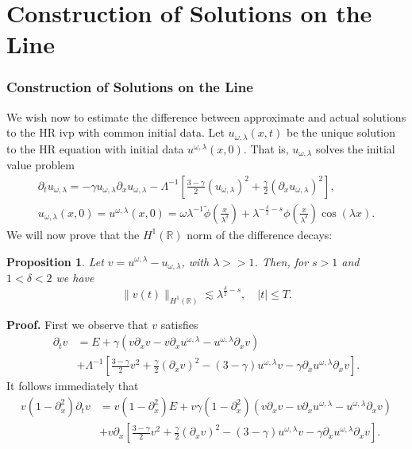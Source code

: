 \documentclass{beamer}
\newcommand{\rr}{\mathbb{R}}
\newcommand{\p}{\partial}
\newtheorem{proposition}{Proposition}
\begin{document}
\section{Construction of Solutions on the Line}
\begin{frame}
	\frametitle{Construction of Solutions on the Line}
We wish now to estimate the difference between approximate and actual 
solutions to
the HR ivp with common initial data. Let
$u_{\omega,\lambda}(x,t)$ be the unique solution to the HR equation
with initial data $u^{\omega,\lambda}(x,0)$. That is,
$u_{\omega,\lambda}$ solves the initial value problem
\begin{gather*}
 \p_t u_{\omega,\lambda} = - \gamma u_{\omega,\lambda} \p_x 
u_{\omega,\lambda} - \Lambda^{-1} \left[
\frac{3- \gamma}{2}\left( u_{\omega,\lambda} \right)^2 + 
\frac{\gamma}{2}\left(
\p_x u_{\omega,\lambda} \right)^2
\right], 
\\
 u_{\omega,\lambda}(x, 0) = u^{\omega,\lambda}(x,0) = \omega \lambda^{-1}
\tilde{\phi} \left( \frac{x}{\lambda^\delta} \right)
+ \lambda^{-\frac{\delta}{2} -s}
\phi\left( \frac{x}{\lambda^\delta} \right) \cos(\lambda x).
\end{gather*}
%
%
%
We will now prove that the $H^1(\rr)$ norm of the difference decays: 
%
\end{frame}
%
%
%
%
%
%
%
%
%
%
%
%
\begin{frame}
%
%
\begin{proposition}
\label{applelem:bound_for_difference-of-approx-and-actual-soln}
%
Let $v = u^{\omega,\lambda} - u_{\omega,\lambda}$, with $\lambda >>1$.
Then, for $s > 1$ and $1<\delta<2$ we have
%
%
\begin{equation*} \|
v(t)
\|_{H^1(\rr)}
\lesssim \lambda^{\frac{\delta}{2} -s}, \quad
|t| \le T.
\end{equation*}
%
%
\end{proposition}
%
%
\pause
{\bf   Proof.}
First we observe that $v$ satisfies 
%
%
\begin{equation*}
\begin{split}
\p_t v & = E + \gamma(v \p_x v - v \p_x u^{\omega,\lambda} - 
u^{\omega,\lambda} \p_x v) \\
& + \Lambda^{-1}  \left[ \frac{3-
\gamma}{2}v^2 + \frac{\gamma}{2}\left( \p_x v \right)^2 - \left(
3 - \gamma \right)u^{\omega,\lambda} v -
\gamma \p_x u^{\omega,\lambda} \p_x v \right].
\end{split}
\end{equation*}
\pause
It follows immediately that
		\begin{equation*}
			\label{applev-dtv-pseudo-functional-equality*}
			\begin{split}
			v(1-\p_x^2)\p_t v &= v(1- \p_x^2)E + v\gamma(1- \p_x^2)(v\p_x v 
			- v\p_x u^{\omega,\lambda} -
			u^{\omega,\lambda} \p_x v)
			\\
			&+ v\p_x \left[ \frac{3-\gamma}{2}v^2 + \frac{\gamma}{2}(\p_x v)^2 -
			(3-\gamma)u^{\omega,\lambda} v - \gamma \p_x u^{\omega,\lambda} \p_x v \right].
		\end{split}
	\end{equation*}
\end{frame}
\end{document}
